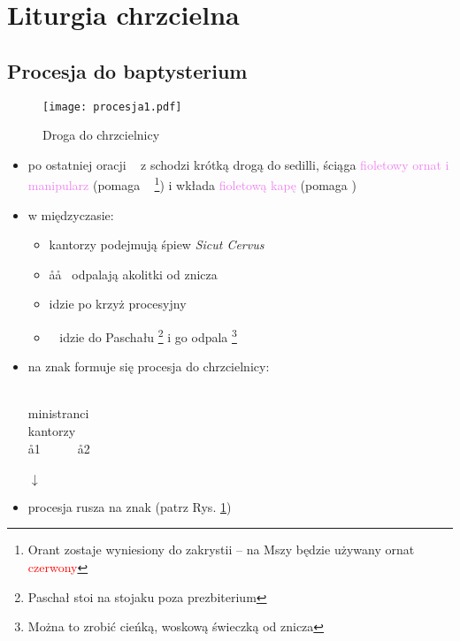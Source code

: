 \section{Liturgia chrzcielna}

\subsection{Procesja do baptysterium}
\begin{figure}[!hb]
	\centering
	\texttt{[image: procesja1.pdf]}
	\caption{Droga do chrzcielnicy}
	\label{fig:procesja1}
\end{figure}
\begin{itemize}
	\item po ostatniej oracji \ii~ z  schodzi krótką drogą do sedilli,
	      ściąga \textcolor{violet}{fioletowy ornat i manipularz} (pomaga \zz~
	      \footnote{Orant zostaje wyniesiony do zakrystii -- na Mszy będzie
		      używany ornat \textcolor{red}{czerwony}}) i wkłada
	      \textcolor{violet}{fioletową kapę} (pomaga )
	\item w międzyczasie:
	      \begin{itemize}
		      \item kantorzy podejmują śpiew \textit{Sicut Cervus}
		      \item \aa\aa~ odpalają akolitki od znicza
		      \item {} idzie po krzyż procesyjny
		      \item \paschal~ idzie do Paschału \footnote{Paschał stoi na
			            stojaku poza prezbiterium} i go odpala \footnote{Można
			            to zrobić cieńką, woskową świeczką od znicza}
	      \end{itemize}
	\item na znak  formuje się procesja do chrzcielnicy:
	      \begin{center}
		      ~~~\ii~~~ \smallskip\\
		      ministranci \smallskip\\
		      kantorzy \smallskip\\
		      \aa1~~~~~~\aa2 \smallskip\\
		      ~~\paschal~~~~~~~ \smallskip\\
		      $\downarrow$
	      \end{center}
	\item procesja rusza na znak  (patrz Rys. \ref{fig:procesja1})
\end{itemize}
